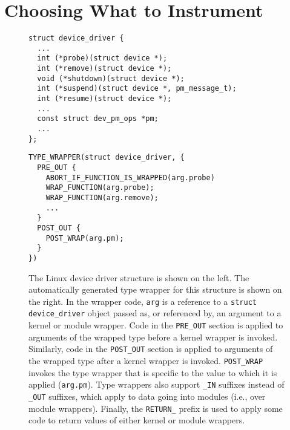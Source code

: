 \documentclass[preprint]{sigplanconf}
\begin{document}

\section{Choosing What to Instrument}

\begin{figure*}[ht!]
\lstset{language=C, tabsize=2, stepnumber=1}
\begin{multicols}{2}
\begin{lstlisting}[basicstyle=\footnotesize\ttfamily]
struct device_driver {
  ...
  int (*probe)(struct device *);
  int (*remove)(struct device *);
  void (*shutdown)(struct device *);
  int (*suspend)(struct device *, pm_message_t);
  int (*resume)(struct device *);
  ...
  const struct dev_pm_ops *pm;
  ...
};
\end{lstlisting}
\columnbreak
\begin{lstlisting}[basicstyle=\footnotesize\ttfamily]
TYPE_WRAPPER(struct device_driver, {
  PRE_OUT {
    ABORT_IF_FUNCTION_IS_WRAPPED(arg.probe)
    WRAP_FUNCTION(arg.probe);
    WRAP_FUNCTION(arg.remove);
    ...
  }
  POST_OUT {
    POST_WRAP(arg.pm);
  }
})
\end{lstlisting}
\end{multicols}
\caption{The Linux device driver structure is shown on the left. The automatically generated type wrapper for this structure is shown on the right. In the wrapper code, \texttt{arg} is a reference to a \texttt{struct device\_driver} object passed as, or referenced by, an argument to a kernel or module wrapper. Code in the \texttt{PRE\_OUT} section is applied to arguments of the wrapped type before a kernel wrapper is invoked. Similarly, code in the \texttt{POST\_OUT} section is applied to arguments of the wrapped type after a kernel wrapper is invoked. \texttt{POST\_WRAP} invokes the type wrapper that is specific to the value to which it is applied (\texttt{arg.pm}). Type wrappers also support \texttt{\_IN} suffixes instead of \texttt{\_OUT} suffixes, which apply to data going into modules (i.e., over module wrappers). Finally, the \texttt{RETURN\_} prefix is used to apply some code to return values of either kernel or module wrappers.}
\label{fig:type_wrapper}
\end{figure*}
\end{document}
